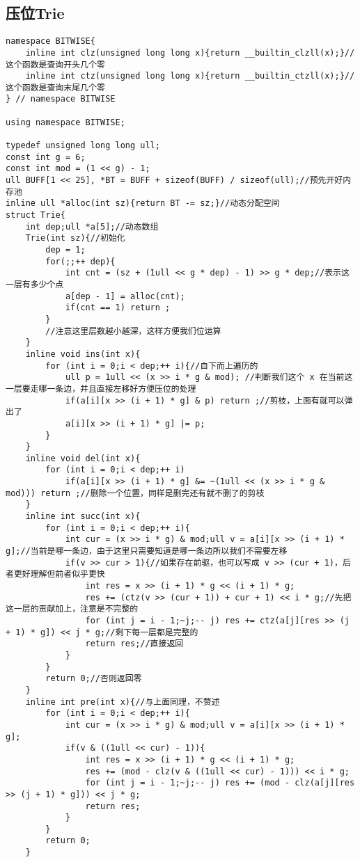 \subsection{压位Trie}
\begin{verbatim}
namespace BITWISE{
    inline int clz(unsigned long long x){return __builtin_clzll(x);}//这个函数是查询开头几个零
    inline int ctz(unsigned long long x){return __builtin_ctzll(x);}//这个函数是查询末尾几个零
} // namespace BITWISE

using namespace BITWISE;

typedef unsigned long long ull;
const int g = 6;
const int mod = (1 << g) - 1;
ull BUFF[1 << 25], *BT = BUFF + sizeof(BUFF) / sizeof(ull);//预先开好内存池
inline ull *alloc(int sz){return BT -= sz;}//动态分配空间
struct Trie{
    int dep;ull *a[5];//动态数组
    Trie(int sz){//初始化
        dep = 1;
        for(;;++ dep){
            int cnt = (sz + (1ull << g * dep) - 1) >> g * dep;//表示这一层有多少个点
            a[dep - 1] = alloc(cnt);
            if(cnt == 1) return ;
        }
        //注意这里层数越小越深，这样方便我们位运算
    }
    inline void ins(int x){
        for (int i = 0;i < dep;++ i){//自下而上遍历的
            ull p = 1ull << (x >> i * g & mod); //判断我们这个 x 在当前这一层要走哪一条边，并且直接左移好方便压位的处理
            if(a[i][x >> (i + 1) * g] & p) return ;//剪枝，上面有就可以弹出了
            a[i][x >> (i + 1) * g] |= p;
        }
    }
    inline void del(int x){
        for (int i = 0;i < dep;++ i)
            if(a[i][x >> (i + 1) * g] &= ~(1ull << (x >> i * g & mod))) return ;//删除一个位置，同样是删完还有就不删了的剪枝
    }
    inline int succ(int x){
        for (int i = 0;i < dep;++ i){
            int cur = (x >> i * g) & mod;ull v = a[i][x >> (i + 1) * g];//当前是哪一条边，由于这里只需要知道是哪一条边所以我们不需要左移
            if(v >> cur > 1){//如果存在前驱，也可以写成 v >> (cur + 1)，后者更好理解但前者似乎更快
                int res = x >> (i + 1) * g << (i + 1) * g;
                res += (ctz(v >> (cur + 1)) + cur + 1) << i * g;//先把这一层的贡献加上，注意是不完整的
                for (int j = i - 1;~j;-- j) res += ctz(a[j][res >> (j + 1) * g]) << j * g;//剩下每一层都是完整的
                return res;//直接返回
            }
        }
        return 0;//否则返回零
    }
    inline int pre(int x){//与上面同理，不赘述
        for (int i = 0;i < dep;++ i){
            int cur = (x >> i * g) & mod;ull v = a[i][x >> (i + 1) * g];
            if(v & ((1ull << cur) - 1)){
                int res = x >> (i + 1) * g << (i + 1) * g;
                res += (mod - clz(v & ((1ull << cur) - 1))) << i * g;
                for (int j = i - 1;~j;-- j) res += (mod - clz(a[j][res >> (j + 1) * g])) << j * g;
                return res;
            }
        }
        return 0;
    }


\end{verbatim}
